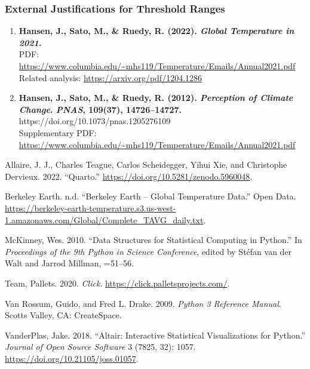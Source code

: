 \documentclass[
  letterpaper,
  DIV=11,
  numbers=noendperiod]{scrartcl}
\newlength{\cslhangindent}
\newenvironment{CSLReferences}[2] %
 {\begin{list}{}{%
  \setlength{\itemindent}{0pt}
  \setlength{\leftmargin}{0pt}
  \setlength{\parsep}{0pt}
  \ifodd #1
   \setlength{\leftmargin}{\cslhangindent}
   \setlength{\itemindent}{-1\cslhangindent}
  \fi
  \setlength{\itemsep}{#2\baselineskip}}}
 {\end{list}}
\begin{document}
\subsubsection{External Justifications for Threshold
Ranges}\label{external-justifications-for-threshold-ranges}

\begin{enumerate}
\def\labelenumi{\arabic{enumi}.}
\setcounter{enumi}{3}
\item
  \textbf{Hansen, J., Sato, M., \& Ruedy, R. (2022). \emph{Global
  Temperature in 2021}.}\\
  PDF:
  \url{https://www.columbia.edu/~mhs119/Temperature/Emails/Annual2021.pdf}\\
  Related analysis: \url{https://arxiv.org/pdf/1204.1286}
\item
  \textbf{Hansen, J., Sato, M., \& Ruedy, R. (2012). \emph{Perception of
  Climate Change}. \emph{PNAS}, 109(37), 14726--14727.}\\
  https://doi.org/10.1073/pnas.1205276109\\
  Supplementary PDF:
  \url{https://www.columbia.edu/~mhs119/Temperature/Emails/Annual2021.pdf}
\end{enumerate}

\label{refs}
\begin{CSLReferences}{1}{0}
Allaire, J. J., Charles Teague, Carlos Scheidegger, Yihui Xie, and
Christophe Dervieux. 2022. {``{Quarto}.''}
\url{https://doi.org/10.5281/zenodo.5960048}.

Berkeley Earth. n.d. {``Berkeley Earth -- Global Temperature Data.''}
Open Data.
\url{https://berkeley-earth-temperature.s3.us-west-1.amazonaws.com/Global/Complete_TAVG_daily.txt}.

McKinney, Wes. 2010. {``Data Structures for Statistical Computing in
Python.''} In \emph{Proceedings of the 9th Python in Science
Conference}, edited by Stéfan van der Walt and Jarrod Millman, =51--56.

Team, Pallets. 2020. \emph{Click}.
\url{https://click.palletsprojects.com/}.

Van Rossum, Guido, and Fred L. Drake. 2009. \emph{Python 3 Reference
Manual}. Scotts Valley, CA: CreateSpace.

VanderPlas, Jake. 2018. {``Altair: Interactive Statistical
Visualizations for Python.''} \emph{Journal of Open Source Software} 3
(7825, 32): 1057. \url{https://doi.org/10.21105/joss.01057}.

\end{CSLReferences}
\end{document}
